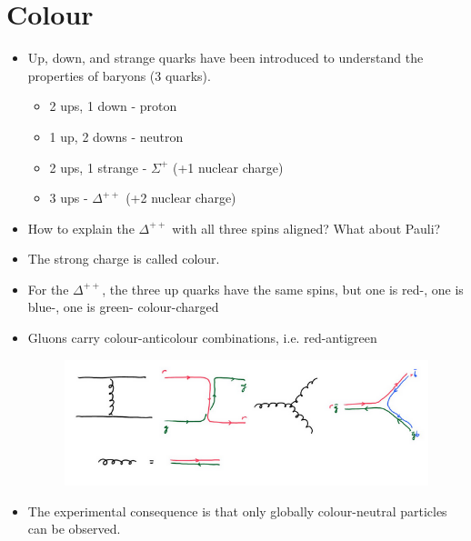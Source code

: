 \documentclass[a4paper, 11pt, normalem]{report}
\begin{document}
\section{Colour}
\begin{itemize}
    \item Up, down, and strange quarks have been introduced to understand the properties of baryons (3 quarks).
        \begin{itemize}
            \item 2 ups, 1 down - proton
            \item 1 up, 2 downs - neutron
            \item 2 ups, 1 strange - $\Sigma^+$ (+1 nuclear charge)
            \item 3 ups - $\Delta^{++}$ (+2 nuclear charge)
        \end{itemize}
    \item How to explain the $\Delta^{++}$ with all three spins aligned? What about Pauli?
    \item The strong charge is called colour. 
            \item For the $\Delta^{++}$, the three up quarks have the same spins, but one is red-, one is blue-, one is green- colour-charged
    \item Gluons carry colour-anticolour combinations, i.e. red-antigreen
        \begin{figure}[H]
            \centering
            \includegraphics[scale=0.5]{colour.png}
        \end{figure}
    \item The experimental consequence is that only globally colour-neutral particles can be observed.
\end{itemize}
\end{document}
